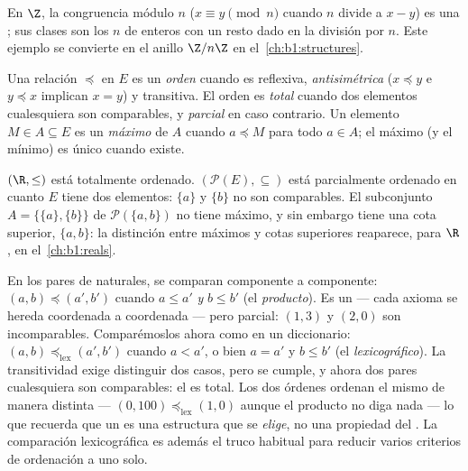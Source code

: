 \begin{example}\label{ex:b1:logic:congruence}
En $\Z$, la congruencia módulo $n$ ($x \equiv y \pmod n$ cuando $n$
divide a $x - y$) es una ; sus clases son los
$n$  de enteros con un resto dado en la división por $n$.
Este ejemplo se convierte en el anillo $\Z/n\Z$ en el~\cref{ch:b1:structures}.
\end{example}

\begin{definition}\label{def:b1:logic:order}
Una relación $\preceq$ en $E$ es un \emph{orden}
cuando es reflexiva, \emph{antisimétrica} ($x \preceq y$ e $y \preceq x$
implican $x = y$) y transitiva. El orden es \emph{total} cuando dos
elementos cualesquiera son comparables, y \emph{parcial} en caso
contrario. Un elemento $M \in A \subseteq E$ es un \emph{máximo} de $A$
cuando $a \preceq M$ para todo $a \in A$; el máximo (y el mínimo) es
único cuando existe.
\end{definition}

\begin{example}\label{ex:b1:logic:orders}
$(\R, \leq)$ está totalmente ordenado. $(\mathcal{P}(E), \subseteq)$
está parcialmente ordenado en cuanto $E$ tiene dos elementos: $\{a\}$ y
$\{b\}$ no son comparables. El subconjunto $A = \{\{a\}, \{b\}\}$ de
$\mathcal{P}(\{a,b\})$ no tiene máximo, y sin embargo tiene una cota
superior, $\{a, b\}$: la distinción entre máximos y cotas superiores
reaparece, para $\R$, en el~\cref{ch:b1:reals}.
\end{example}

\begin{example}\label{ex:b1:logic:lexorder}
En los pares de naturales, se comparan componente a componente:
$(a, b) \preceq (a', b')$ cuando $a \leq a'$ \emph{y} $b \leq b'$ (el
\emph{ producto}). Es un  --- cada axioma se hereda
coordenada a coordenada --- pero parcial: $(1, 3)$ y $(2, 0)$ son
incomparables. Comparémoslos ahora como en un diccionario:
$(a, b) \preceq_{\mathrm{lex}} (a', b')$ cuando $a < a'$, o bien
$a = a'$ y $b \leq b'$ (el \emph{ lexicográfico}). La
transitividad exige distinguir dos casos, pero se cumple, y ahora dos
pares cualesquiera son comparables: el  es total. Los dos
órdenes ordenan el mismo  de manera distinta ---
$(0, 100) \preceq_{\mathrm{lex}} (1, 0)$ aunque el  producto no
diga nada --- lo que recuerda que un  es una estructura que se
\emph{elige}, no una propiedad del . La comparación
lexicográfica es además el truco habitual para reducir varios criterios
de ordenación a uno solo.
\end{example}


